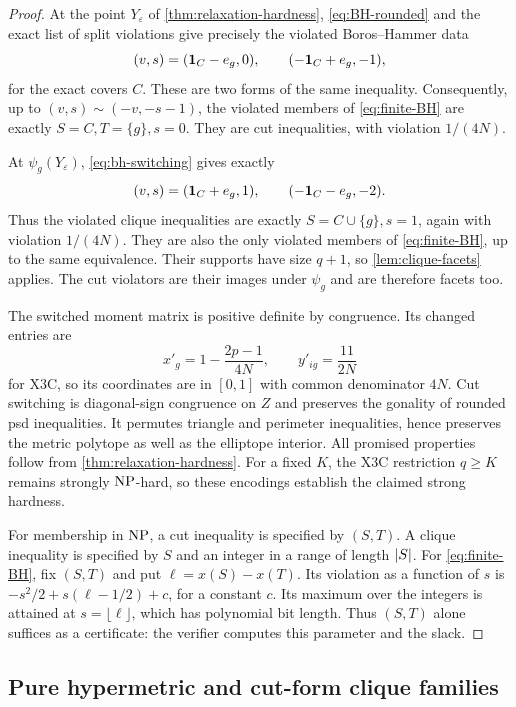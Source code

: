 \begin{proof}
At the point $Y_\varepsilon$ of \cref{thm:relaxation-hardness},
\eqref{eq:BH-rounded} and the exact list of split violations give precisely
the violated Boros--Hammer data
\[
 (v,s)=(\mathbf 1_C-e_g,0),\qquad(-\mathbf 1_C+e_g,-1),
\]
for the exact covers $C$. These are two forms of the same inequality.
Consequently, up to $(v,s)\sim(-v,-s-1)$, the violated members of
\eqref{eq:finite-BH} are exactly $S=C,T=\{g\},s=0$.
They are cut inequalities, with violation $1/(4N)$.

At $\psi_g(Y_\varepsilon)$, \eqref{eq:bh-switching} gives exactly
\[
 (v,s)=(\mathbf 1_C+e_g,1),\qquad(-\mathbf 1_C-e_g,-2).
\]
Thus the violated clique inequalities are exactly
$S=C\cup\{g\},s=1$, again with violation $1/(4N)$.
They are also the only violated members of \eqref{eq:finite-BH},
up to the same equivalence.
Their supports have size $q+1$, so \cref{lem:clique-facets} applies.
The cut violators are their images under $\psi_g$ and are therefore
facets too.

The switched moment matrix is positive definite by congruence. Its changed
entries are
\[
 x'_g=1-\frac{2p-1}{4N},\qquad y'_{ig}=\frac{11}{2N}
\]
for X3C, so its coordinates are in $[0,1]$ with common denominator $4N$.
Cut switching is diagonal-sign congruence on $Z$ and preserves the
gonality of rounded psd inequalities. It permutes triangle and perimeter
inequalities, hence preserves the metric polytope as well as the
elliptope interior. All promised properties follow from
\cref{thm:relaxation-hardness}. For a fixed $K$, the X3C restriction
$q\geq K$ remains strongly $\mathrm{NP}$-hard, so these encodings establish
the claimed strong hardness.

For membership in $\mathrm{NP}$, a cut inequality is specified by $(S,T)$.
A clique inequality is specified by $S$ and an integer in a range of
length $\left\lvert S\right\rvert$. For \eqref{eq:finite-BH}, fix $(S,T)$ and put
$\ell=x(S)-x(T)$. Its violation as a function of $s$ is
$-s^2/2+s(\ell-1/2)+c$, for a constant $c$.
Its maximum over the integers is attained at $s=\lfloor\ell\rfloor$,
which has polynomial bit length. Thus $(S,T)$ alone suffices as a
certificate: the verifier computes this parameter and the slack.
\end{proof}

\subsection{Pure hypermetric and cut-form clique families}

